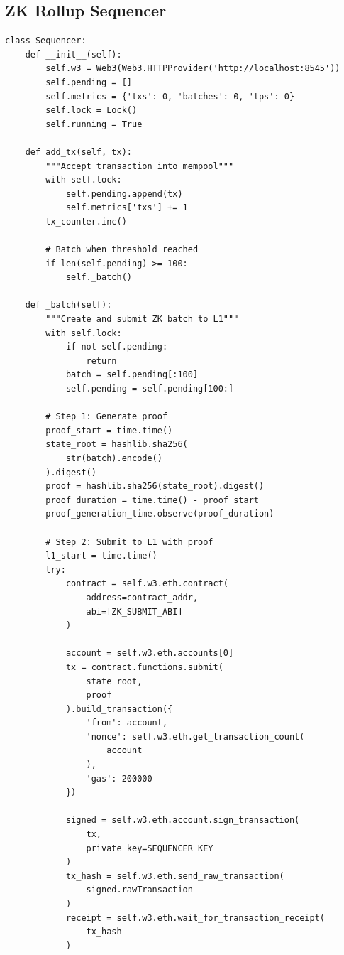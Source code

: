 \documentclass[
]{elteikthesis}[2024/04/26]
\begin{document}
\subsection{ZK Rollup Sequencer}

\begin{listing}[H]
    \begin{verbatim}
class Sequencer:
    def __init__(self):
        self.w3 = Web3(Web3.HTTPProvider('http://localhost:8545'))
        self.pending = []
        self.metrics = {'txs': 0, 'batches': 0, 'tps': 0}
        self.lock = Lock()
        self.running = True
        
    def add_tx(self, tx):
        """Accept transaction into mempool"""
        with self.lock:
            self.pending.append(tx)
            self.metrics['txs'] += 1
        tx_counter.inc()
        
        # Batch when threshold reached
        if len(self.pending) >= 100:
            self._batch()
    
    def _batch(self):
        """Create and submit ZK batch to L1"""
        with self.lock:
            if not self.pending:
                return
            batch = self.pending[:100]
            self.pending = self.pending[100:]
        
        # Step 1: Generate proof
        proof_start = time.time()
        state_root = hashlib.sha256(
            str(batch).encode()
        ).digest()
        proof = hashlib.sha256(state_root).digest()
        proof_duration = time.time() - proof_start
        proof_generation_time.observe(proof_duration)
        
        # Step 2: Submit to L1 with proof
        l1_start = time.time()
        try:
            contract = self.w3.eth.contract(
                address=contract_addr,
                abi=[ZK_SUBMIT_ABI]
            )
            
            account = self.w3.eth.accounts[0]
            tx = contract.functions.submit(
                state_root, 
                proof
            ).build_transaction({
                'from': account,
                'nonce': self.w3.eth.get_transaction_count(
                    account
                ),
                'gas': 200000
            })
            
            signed = self.w3.eth.account.sign_transaction(
                tx, 
                private_key=SEQUENCER_KEY
            )
            tx_hash = self.w3.eth.send_raw_transaction(
                signed.rawTransaction
            )
            receipt = self.w3.eth.wait_for_transaction_receipt(
                tx_hash
            )
            

\end{verbatim}
\end{listing}
\end{document}
